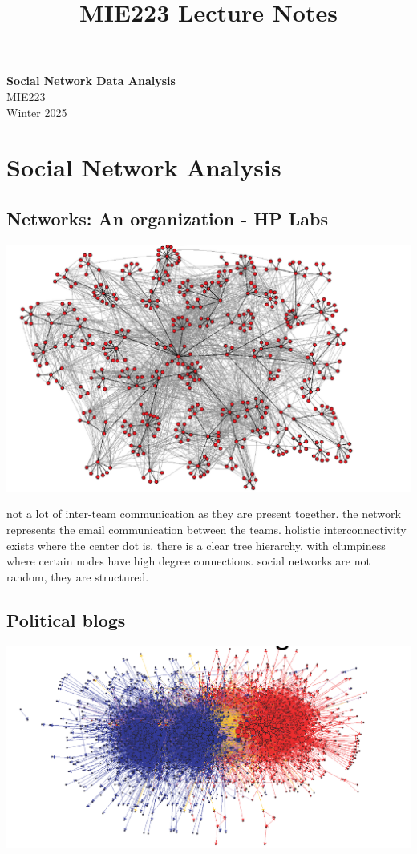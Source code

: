 \documentclass[11pt]{article}
\theoremstyle{definition}
\begin{document}
\setcounter{section}{0}
\title{MIE223 Lecture Notes}

\thispagestyle{empty}

\begin{center}
{\LARGE \bf Social Network Data Analysis}\\
{\large MIE223}\\
Winter 2025
\end{center}
\linespread{0.75}
\section{Social Network Analysis}
\subsection{Networks: An organization - HP Labs}
\includegraphics[width=\textwidth/2]{1.png}

not a lot of inter-team communication as they are present together.
the network represents the email communication between the teams.
holistic interconnectivity exists where the center dot is.
there is a clear tree hierarchy, with clumpiness where certain nodes
have high degree connections. social networks are not random, they are
structured.

\subsection{Political blogs}
\includegraphics[width=\textwidth/2]{2.png}
\end{document}
